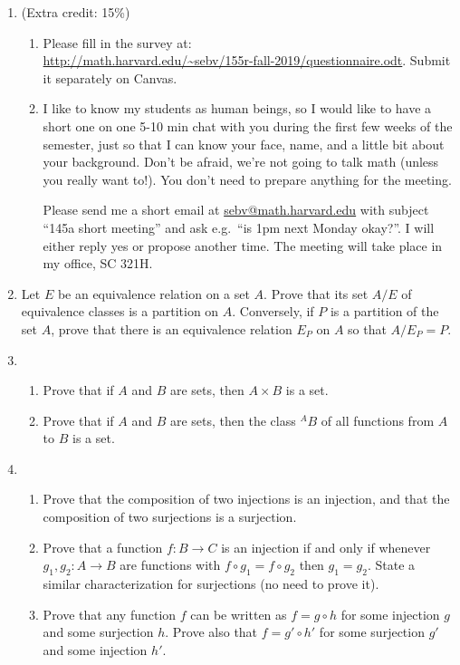 \documentclass{amsart}
\theoremstyle{definition}
\newcommand{\fct}[2]{{}^{#1} {#2}}
\begin{document}
\begin{enumerate}
\item (Extra credit: 15\%) \begin{enumerate}
\item Please fill in the survey at: \\
  \url{http://math.harvard.edu/~sebv/155r-fall-2019/questionnaire.odt}. Submit it separately on Canvas.
\item I like to know my students as human beings, so I would like to have a short one on one 5-10 min chat with you during the first few weeks of the semester, just so that I can know your face, name, and a little bit about your background. Don't be afraid, we're not going to talk math (unless you really want to!). You don't need to prepare anything for the meeting.

  Please send me a short email at \url{sebv@math.harvard.edu} with subject ``145a short meeting'' and ask e.g.\ ``is 1pm next Monday okay?''. I will either reply yes or propose another time. The meeting will take place in my office, SC 321H.
\end{enumerate}
\item Let $E$ be an equivalence relation on a set $A$. Prove that its set $A / E$ of equivalence classes is a partition on $A$. Conversely, if $P$ is a partition of the set $A$, prove that there is an equivalence relation $E_P$ on $A$ so that $A / E_P = P$.
\item 
  \begin{enumerate}
  \item Prove that if $A$ and $B$ are sets, then $A \times B$ is a set.
  \item Prove that if $A$ and $B$ are sets, then the class $\fct{A}{B}$ of all functions from $A$ to $B$ is a set.
  \end{enumerate}
\item \begin{enumerate}
\item Prove that the composition of two injections is an injection, and that the composition of two surjections is a surjection.
\item Prove that a function $f: B \to C$ is an injection if and only if whenever $g_1, g_2: A \to B$ are functions with $f \circ g_1 = f \circ g_2$ then $g_1 = g_2$. State a similar characterization for surjections (no need to prove it).
\item Prove that any function $f$ can be written as $f = g \circ h$ for some injection $g$ and some surjection $h$. Prove also that $f = g' \circ h'$ for some surjection $g'$ and some injection $h'$.

\end{enumerate}
\end{enumerate}
\end{document}
